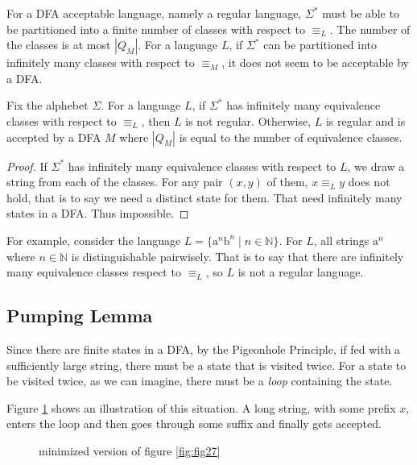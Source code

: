 \documentclass[11pt]{article}
\begin{document}
For a DFA acceptable language, namely a regular language, $\Sigma^\ast$
must be able to be partitioned into a finite number of classes with
respect to $\equiv_L$. The number of the classes is at most $|Q_M|$.
For a language $L$, if $\Sigma^\ast$ can be partitioned into infinitely
many classes with respect to $\equiv_M$, it does not seem to be
acceptable by a DFA.

\begin{theorem}
Fix the alphebet $\Sigma$. For a language $L$, if $\Sigma^\ast$ has
infinitely many equivalence classes with respect to $\equiv_L$, then
$L$ is not regular. Otherwise, $L$ is regular and is accepted by a
DFA $M$ where $|Q_M|$ is equal to the number of equivalence classes.
\end{theorem}

\begin{proof}
If $\Sigma^\ast$ has infinitely many equivalence classes with respect to
$L$, we draw a string from each of the classes. For any pair $(x,y)$ of
them, $x \equiv_L y$ does not hold, that is to say we need a distinct
state for them. That need infinitely many states in a DFA. Thus
impossible.
\end{proof}

For example, consider the language $L = \{\mathrm{a}^n\mathrm{b}^n \mid n \in \mathbb{N}\}$.
For $L$, all strings $\mathrm{a}^n$ where $n \in \mathbb{N}$ is distinguishable
pairwisely. That is to say that there are infinitely many equivalence
classes respect to $\equiv_L$, so $L$ is not a regular language.

\subsection{Pumping Lemma}

Since there are finite states in a DFA, by the Pigeonhole Principle, if
fed with a sufficiently large string, there must be a state that is
visited twice. For a state to be visited twice, as we can imagine, there
must be a \emph{loop} containing the state.

Figure \ref{fig:fig30} shows an illustration of this situation. A long
string, with some prefix $x$, enters the loop and then goes through some
suffix and finally gets accepted.

\begin{figure}[ht]
    \centering
    \caption{minimized version of figure \ref{fig:fig27}}
    \label{fig:fig30}
\end{figure}
\end{document}
